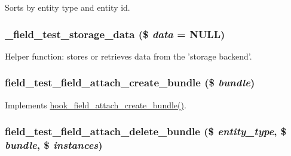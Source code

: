 Sorts by entity type and entity id. \hypertarget{field__test_8storage_8inc_aaf0cca5b16dd0669144dc5b3c8b1a2ba}{
\subsubsection[{\_\-field\_\-test\_\-storage\_\-data}]{\setlength{\rightskip}{0pt plus 5cm}\_\-field\_\-test\_\-storage\_\-data (\$ {\em data} = {\ttfamily NULL})}}
\label{field__test_8storage_8inc_aaf0cca5b16dd0669144dc5b3c8b1a2ba}
Helper function: stores or retrieves data from the 'storage backend'. \hypertarget{field__test_8storage_8inc_a3581120282b508adec7dddc2f0fabf86}{
\subsubsection[{field\_\-test\_\-field\_\-attach\_\-create\_\-bundle}]{\setlength{\rightskip}{0pt plus 5cm}field\_\-test\_\-field\_\-attach\_\-create\_\-bundle (\$ {\em bundle})}}
\label{field__test_8storage_8inc_a3581120282b508adec7dddc2f0fabf86}
Implements \hyperlink{group__field__attach_gad2e99b8b55c106c289a8241db00f0f30}{hook\_\-field\_\-attach\_\-create\_\-bundle()}. \hypertarget{field__test_8storage_8inc_aa5c9edad9e400853b20018ed13eca602}{
\subsubsection[{field\_\-test\_\-field\_\-attach\_\-delete\_\-bundle}]{\setlength{\rightskip}{0pt plus 5cm}field\_\-test\_\-field\_\-attach\_\-delete\_\-bundle (\$ {\em entity\_\-type}, \/  \$ {\em bundle}, \/  \$ {\em instances})}}
\label{field__test_8storage_8inc_aa5c9edad9e400853b20018ed13eca602}
